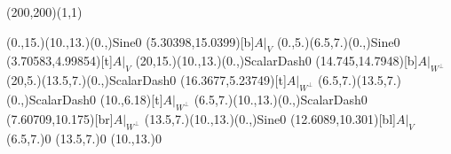 \unitlength=1bp%

\begin{feynartspicture}(200,200)(1,1)

\FADiagram{}
\FAProp(0.,15.)(10.,13.)(0.,){Sine}{0}
\FALabel(5.30398,15.0399)[b]{$A|_V$}
\FAProp(0.,5.)(6.5,7.)(0.,){Sine}{0}
\FALabel(3.70583,4.99854)[t]{$A|_V$}
\FAProp(20,15.)(10.,13.)(0.,){ScalarDash}{0}
\FALabel(14.745,14.7948)[b]{$A|_{W^\perp}$}
\FAProp(20,5.)(13.5,7.)(0.,){ScalarDash}{0}
\FALabel(16.3677,5.23749)[t]{$A|_{W^\perp}$}
\FAProp(6.5,7.)(13.5,7.)(0.,){ScalarDash}{0}
\FALabel(10.,6.18)[t]{$A|_{W^\perp}$}
\FAProp(6.5,7.)(10.,13.)(0.,){ScalarDash}{0}
\FALabel(7.60709,10.175)[br]{$A|_{W^\perp}$}
\FAProp(13.5,7.)(10.,13.)(0.,){Sine}{0}
\FALabel(12.6089,10.301)[bl]{$A|_V$}
\FAVert(6.5,7.){0}
\FAVert(13.5,7.){0}
\FAVert(10.,13.){0}
\end{feynartspicture}

